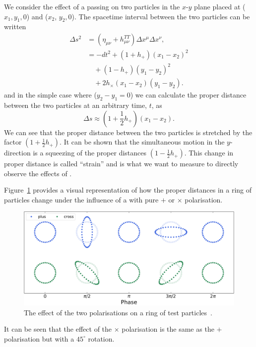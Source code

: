 We consider the effect of a passing \gw on two particles in the $x$-$y$ plane placed at ($x_{1}, y_{1}, 0$) and ($x_{2}$, $y_{2}, 0$). The spacetime interval between the two particles can be written
%
\begin{align}
    \Delta s^{2} &= \left(\eta_{\mu\nu} + h^{TT}_{\mu\nu}\right) \Delta x^{\mu} \Delta x^{\nu}, \\
    &= -dt^{2} + \left(1 + h_{+}\right)(x_{1} - x_{2})^{2} \nonumber \\
    &\quad + \left(1 - h_{+}\right)(y_{1} - y_{2})^{2} \nonumber \\
    &\quad + 2h_{\times} (x_{1} - x_{2})(y_{1} - y_{2}).
\end{align}
%
and in the simple case where ($y_{2} - y_{1} = 0$) we can calculate the proper distance between the two particles at an arbitrary time, $t$, as
%
\begin{equation}
    \Delta s \approx \left( 1 + \frac{1}{2} h_{+}\right)(x_{1} - x_{2}).
    \label{1:eq:proper_dist_two_particles}
\end{equation}
%
We can see that the proper distance between the two particles is stretched by the factor $(1 + \frac{1}{2}h_{+})$. It can be shown that the simultaneous motion in the $y$-direction is a squeezing of the proper distances $(1 - \frac{1}{2}h_{+})$. This change in proper distance is called \gwadj ``strain'' and is what we want to measure to directly observe the effects of \gws.

Figure~\ref{1:fig:ring_of_particles} provides a visual representation of how the proper distances in a ring of particles change under the influence of a \gw with pure $+$ or $\times$ polarisation.
%
\begin{figure}
   \includegraphics[width=\textwidth]{images/1_general_relativity/polarisation.png}
   \caption{The effect of the two polarisations on a ring of test particles~\cite{gw_polarisation_plots}.}
   \label{1:fig:ring_of_particles}
\end{figure}
%
It can be seen that the effect of the $\times$ polarisation is the same as the $+$ polarisation but with a $45^{\circ}$ rotation.

